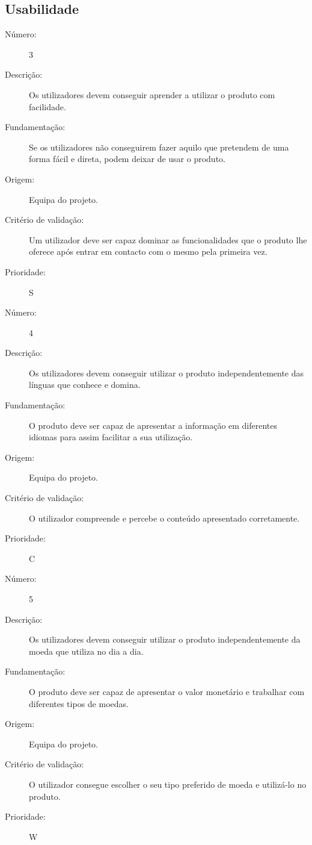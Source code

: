 \documentclass{article}
\begin{document}
  \subsection{Usabilidade}
     \begin{description}
        \item[Número:]3
        \item[Descrição:] Os utilizadores devem conseguir aprender a utilizar o produto com facilidade.
        \item[Fundamentação:]Se os utilizadores não conseguirem fazer aquilo que pretendem de uma forma fácil e direta, podem deixar de usar o produto.
        \item[Origem:]Equipa do projeto.
        \item[Critério de validação:]Um utilizador deve ser capaz dominar as funcionalidades que o produto lhe oferece após entrar em contacto com o mesmo pela primeira vez.
        \item[Prioridade:]S
      \end{description}
      \vspace{0.5cm}
      \begin{description}
        \item[Número:]4
        \item[Descrição:]Os utilizadores devem conseguir utilizar o produto independentemente das línguas que conhece e domina.
        \item[Fundamentação:]O produto deve ser capaz de apresentar a informação em diferentes idiomas para assim facilitar a sua utilização.
        \item[Origem:]Equipa do projeto.
        \item[Critério de validação:]O utilizador compreende e percebe o conteúdo apresentado corretamente.    
        \item[Prioridade:]C
      \end{description}
      \vspace{0.5cm}
      \begin{description}
        \item[Número:]5
        \item[Descrição:]Os utilizadores devem conseguir utilizar o produto independentemente da moeda que utiliza no dia a dia.
        \item[Fundamentação:]O produto deve ser capaz de apresentar o valor monetário e trabalhar com diferentes tipos de moedas.
        \item[Origem:]Equipa do projeto.
        \item[Critério de validação:]O utilizador consegue escolher o seu tipo preferido de moeda e utilizá-lo no produto.
        \item[Prioridade:]W
      \end{description}
\end{document}
